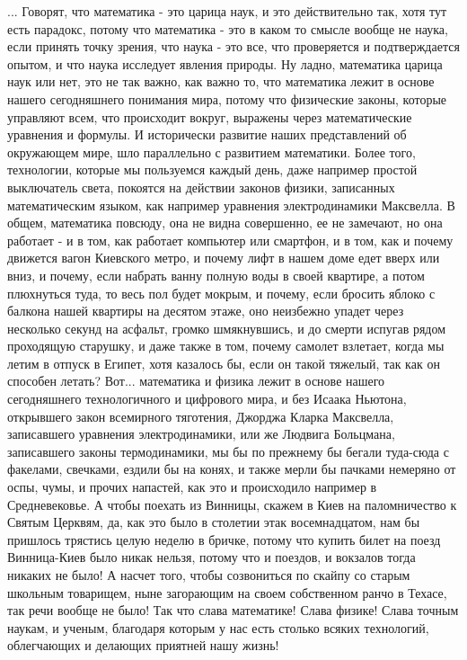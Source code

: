 ... Говорят, что математика - это царица наук, и это действительно так, хотя
тут есть парадокс, потому что математика - это в каком то смысле вообще не
наука, если принять точку зрения, что наука - это все, что проверяется и
подтверждается опытом, и что наука исследует явления природы. Ну ладно,
математика царица наук или нет, это не так важно, как важно то, что математика
лежит в основе нашего сегодняшнего понимания мира, потому что физические
законы, которые управляют всем, что происходит вокруг, выражены через
математические уравнения и формулы. И исторически развитие наших представлений
об окружающем мире, шло параллельно с развитием математики.  Более того,
технологии, которые мы пользуемся каждый день, даже например простой
выключатель света, покоятся на действии законов физики, записанных
математическим языком, как например уравнения электродинамики Максвелла.  В
общем, математика повсюду, она не видна совершенно, ее не замечают, но она
работает - и в том, как работает компьютер или смартфон, и в том, как и почему
движется вагон Киевского метро, и почему лифт в нашем доме едет вверх или вниз,
и почему, если набрать ванну полную воды в своей квартире, а потом плюхнуться
туда, то весь пол будет мокрым, и почему, если бросить яблоко с балкона нашей
квартиры на десятом этаже, оно неизбежно упадет через несколько секунд на
асфальт, громко шмякнувшись, и до смерти испугав рядом проходящую старушку, и
даже также в том, почему самолет взлетает, когда мы летим в отпуск в Египет,
хотя казалось бы, если он такой тяжелый, так как он способен летать? Вот...
математика и физика лежит в основе нашего сегодняшнего технологичного и
цифрового мира, и без Исаака Ньютона, открывшего закон всемирного тяготения,
Джорджа Кларка Максвелла, записавшего уравнения электродинамики, или же Людвига
Больцмана, записавшего законы термодинамики, мы бы по прежнему бы бегали
туда-сюда с факелами, свечками, ездили бы на конях, и также мерли бы пачками
немеряно от оспы, чумы, и прочих напастей, как это и происходило например в
Средневековье. А чтобы поехать из Винницы, скажем в Киев на паломничество к
Святым Церквям, да, как это было в столетии этак восемнадцатом, нам бы пришлось
трястись целую неделю в бричке, потому что купить билет на поезд Винница-Киев
было никак нельзя, потому что и поездов, и вокзалов тогда никаких не было! А
насчет того, чтобы созвониться по скайпу со старым школьным товарищем, ныне
загорающим на своем собственном ранчо в Техасе, так речи вообще не было! Так
что слава математике! Слава физике!  Слава точным наукам, и ученым, благодаря
которым у нас есть столько всяких технологий, облегчающих и делающих приятней
нашу жизнь!

